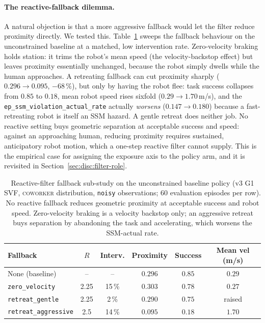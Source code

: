 \documentclass[11pt,a4paper]{report}
\newcommand{\ssm}{SSM}
\newcommand{\coworker}{\textsc{coworker}}
\begin{document}
\paragraph{The reactive-fallback dilemma.}
A natural objection is that a more aggressive fallback would let the
filter reduce proximity directly. We tested this. Table~\ref{tab:filter-fallback}
sweeps the fallback behaviour on the unconstrained baseline at a
matched, low intervention rate. Zero-velocity braking holds station:
it trims the robot's mean speed (the velocity-backstop effect) but
leaves proximity essentially unchanged, because the robot simply
dwells while the human approaches. A retreating fallback can cut
proximity sharply ($0.296 \rightarrow 0.095$, $-68\,\%$), but only by
having the robot flee: task success collapses from $0.85$ to $0.18$,
mean robot speed rises sixfold ($0.29 \rightarrow 1.70$\,m/s), and the
\texttt{ep\_ssm\_violation\_actual\_rate} actually \emph{worsens}
($0.147 \rightarrow 0.180$) because a fast-retreating robot is itself
an \ssm{} hazard. A gentle retreat does neither job. No reactive
setting buys geometric separation at acceptable success and speed:
against an approaching human, reducing proximity requires sustained,
anticipatory robot motion, which a one-step reactive filter cannot
supply. This is the empirical case for assigning the exposure axis
to the policy arm, and it is revisited in
Section~\ref{sec:disc:filter-role}.

\begin{table}[htbp]
\centering
\small
\caption{Reactive-filter fallback sub-study on the unconstrained
baseline policy (v3 G1 SVF, \coworker{} distribution, \texttt{noisy}
observations; 60 evaluation episodes per row). No reactive fallback
reduces geometric proximity at acceptable success and robot speed.
Zero-velocity braking is a velocity backstop only; an aggressive
retreat buys separation by abandoning the task and accelerating,
which worsens the \ssm{}-actual rate.}
\label{tab:filter-fallback}
\begin{tabular}{lccccc}
\toprule
Fallback & $R$ & Interv. & Proximity & Success & Mean vel (m/s) \\
\midrule
None (baseline)        & --   & --      & $0.296$ & $0.85$ & $0.29$ \\
\texttt{zero\_velocity}    & 2.25 & 15\,\% & $0.303$ & $0.78$ & $0.27$ \\
\texttt{retreat\_gentle}   & 2.25 & 2\,\%  & $0.290$ & $0.75$ & raised \\
\texttt{retreat\_aggressive} & 2.5 & 14\,\% & $0.095$ & $0.18$ & $1.70$ \\
\bottomrule
\end{tabular}
\end{table}
\end{document}
